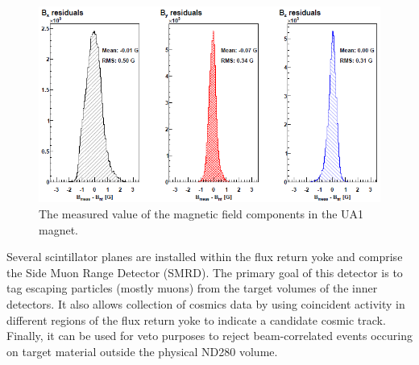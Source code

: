 \begin{figure}
\begin{center}
\includegraphics[width=6in]{./Figures/magneticfield2.png}
\end{center}
\caption{The measured value of the magnetic field components in the
  UA1 magnet.}
\label{fig:magneticfield2}
\end{figure}

Several scintillator planes are installed within the flux return yoke
and comprise the Side Muon Range Detector (SMRD). The primary goal of
this detector is to tag escaping particles (mostly muons) from the target volumes of
the inner detectors. It also allows collection of cosmics data by
using coincident activity in different regions of the flux return yoke
to indicate a candidate cosmic track. Finally, it can be used for veto
purposes to reject beam-correlated events occuring on target material outside
the physical ND280 volume. 

